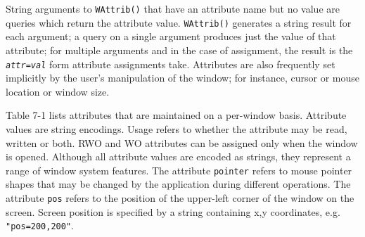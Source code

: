 String arguments to \texttt{WAttrib()} that have an attribute name but
no value are queries which return the attribute value.
\texttt{WAttrib()} generates a string result for each argument; a
query on a single argument produces just the value of that attribute;
for multiple arguments and in the case of assignment, the result is
the \texttt{\textit{attr}}\texttt{=}\texttt{\textit{val}} form
attribute assignments take. Attributes are also frequently set
implicitly by the user's manipulation of the window; for instance,
cursor or mouse location or window size.

Table 7-1 lists attributes that are maintained on a per-window basis.
Attribute values are string encodings. Usage refers to whether the
attribute may be read, written or both. RWO and WO attributes can be
assigned only when the window is opened.  Although all attribute
values are encoded as strings, they represent a range of window system
features. The attribute \texttt{pointer} refers to mouse pointer
shapes that may be changed by the application during different
operations. The attribute \texttt{pos} refers to the position of the
upper-left corner of the window on the screen. Screen position is
specified by a string containing x,y coordinates,
e.g. \texttt{"pos=200,200"}.

\pagebreak

